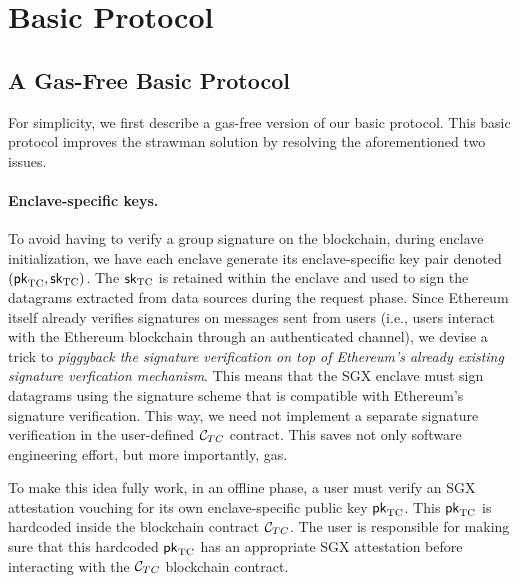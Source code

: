

\section{Basic Protocol}

\subsection{A Gas-Free Basic Protocol}
For simplicity, we first describe a gas-free version of our basic protocol.
This basic protocol improves the strawman solution 
by resolving the aforementioned two issues.

\paragraph{Enclave-specific keys.}
To avoid having to verify a group signature on the blockchain,  
during enclave initialization, 
we have each enclave generate its enclave-specific 
key pair denoted $({\sf pk}_{\textrm{TC}}, {\sf sk}_{\textrm{TC}})$.
The ${\sf sk}_{\textrm{TC}}$ is retained within the enclave and used
to sign the datagrams extracted from data sources during the request phase.
Since Ethereum itself 
already verifies signatures on messages sent from users (i.e.,
users interact with the 
Ethereum blockchain through an authenticated channel), 
we devise a trick to {\it piggyback the signature 
verification on top of Ethereum's already existing signature verfication mechanism}.
This means that the SGX enclave must sign datagrams using the 
signature scheme that is compatible with Ethereum's signature verification.
This way, we need not implement a separate signature verification
in the user-defined ${\cal C}_{TC}$ contract.
This saves 
not only software engineering effort, but more importantly, gas.

To make this idea fully work, in an offline phase, 
a user must verify an SGX attestation vouching for its own enclave-specific 
public key  ${\sf pk}_{\textrm{TC}}$.
This ${\sf pk}_{\textrm{TC}}$ is hardcoded inside the blockchain contract ${\cal C}_{TC}$. 
The user is responsible for making sure that this hardcoded ${\sf pk}_{\textrm{TC}}$ has an 
appropriate SGX attestation before interacting with the ${\cal C}_{TC}$ 
blockchain contract.

